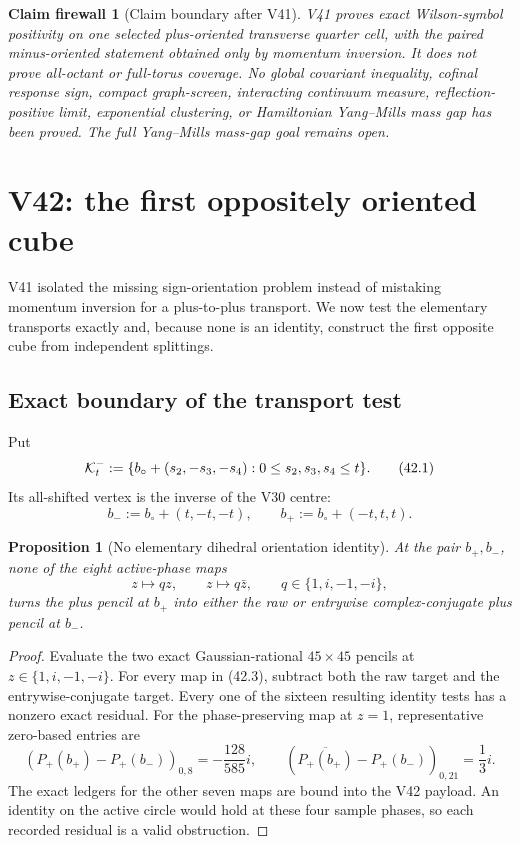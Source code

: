 \documentclass[11pt,oneside]{article}
\newtheorem{proposition}[theorem]{Proposition}
\newtheorem{firewall}[theorem]{Claim firewall}
\theoremstyle{definition}
\theoremstyle{remark}
\begin{document}
\begin{firewall}[Claim boundary after V41]
\label{fire:newv41-final}
V41 proves exact Wilson-symbol positivity on one selected
plus-oriented transverse quarter cell, with the paired
minus-oriented statement obtained only by momentum inversion.  It
does not prove all-octant or full-torus coverage.  No global
covariant inequality, cofinal response sign, compact graph-screen,
interacting continuum measure, reflection-positive limit,
exponential clustering, or Hamiltonian Yang--Mills mass gap has
been proved.  The full Yang--Mills mass-gap goal remains open.
\end{firewall}

\section{V42: the first oppositely oriented cube}
\label{sec:newv42-opposite-cube}

V41 isolated the missing sign-orientation problem instead of
mistaking momentum inversion for a plus-to-plus transport.  We now
test the elementary transports exactly and, because none is an
identity, construct the first opposite cube from independent
splittings.

\subsection{Exact boundary of the transport test}

Put
\[
 {\cal K}_t^-:=
 \{b_\circ+(s_2,-s_3,-s_4):0\le s_2,s_3,s_4\le t\}.    \tag{42.1}
\]
Its all-shifted vertex is the inverse of the V30 centre:
\[
 b_-:=b_\circ+(t,-t,-t),\qquad
 b_+:=b_\circ+(-t,t,t).                                \tag{42.2}
\]

\begin{proposition}[No elementary dihedral orientation identity]
\label{prop:newv42-transport-screen}
At the pair \(b_+,b_-\), none of the eight active-phase maps
\[
 z\longmapsto qz,\qquad z\longmapsto q\bar z,
 \qquad q\in\{1,i,-1,-i\},                             \tag{42.3}
\]
turns the plus pencil at \(b_+\) into either the raw or entrywise
complex-conjugate plus pencil at \(b_-\).
\end{proposition}

\begin{proof}
Evaluate the two exact Gaussian-rational \(45\times45\) pencils at
\(z\in\{1,i,-1,-i\}\).  For every map in (42.3), subtract both the
raw target and the entrywise-conjugate target.  Every one of the
sixteen resulting identity tests has a nonzero exact residual.  For
the phase-preserving map at \(z=1\), representative zero-based
entries are
\[
 (P_+(b_+)-P_+(b_-))_{0,8}=-\frac{128}{585}i,\qquad
 (\overline{P_+(b_+)}-P_+(b_-))_{0,21}=\frac13 i.       \tag{42.4}
\]
The exact ledgers for the other seven maps are bound into the V42
payload.  An identity on the active circle would hold at these four
sample phases, so each recorded residual is a valid obstruction.
\end{proof}
\end{document}
